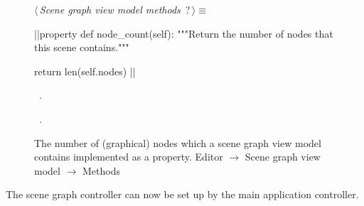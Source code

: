 \documentclass[%
    a4paper,    %
    justified,  %
    nobib,      %
    openany     %
]{tufte-book}
\begin{document}
\begin{figure}
\begin{flushleft} \small
\begin{minipage}{\linewidth}\label{scrap38}\raggedright\small
{} $\langle\,${\itshape Scene graph view model methods}\nobreak\ {\footnotesize {?}}$\,\rangle\equiv$
\vspace{-1ex}
\begin{pythoncode}
|\normalfont{}\fontfamily{}|property
def node_count(self):
    """Return the number of nodes that this scene contains."""

    return len(self.nodes)
|\NWsep|
\end{pythoncode}
\vspace{1.5ex}
\footnotesize
\begin{list}{}{\setlength{\itemsep}{-\parsep}\setlength{\itemindent}{-\leftmargin}}
\item \NWtxtMacroDefBy\ .
\item \NWtxtMacroRefIn\ .

\item{}
\end{list}
\end{minipage}\vspace{4ex}
\end{flushleft}
\caption{The number of (graphical) nodes which a scene graph view model contains
  implemented as a property.
  \newline{}\newline{}Editor $\rightarrow$ Scene graph view model $\rightarrow$
  Methods}
\label{editor:lst:scene-graph-view-model:methods:node-count}
\end{figure}


The scene graph controller can now be set up by the main application controller.
\end{document}
